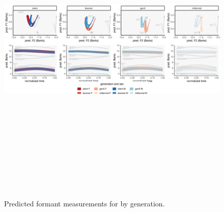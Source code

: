 \begin{figure}[p]
	\centering
	\includegraphics[angle = 90, origin = c, height = 6in]{Figures/BET/BET_sex_panel_plot_wide.pdf}
	\caption[Predicted formant measurements for \bet by generation.]{Predicted formant measurements for \bet by generation.}
	\label{fig:BET_sex_panel_plot_wide}
\end{figure}

